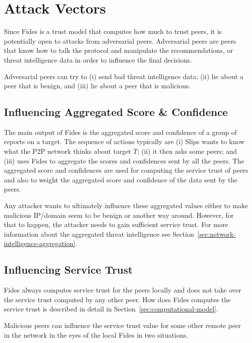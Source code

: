 \section{Attack Vectors}
\label{sec:attack-vectors}
Since Fides is a trust model that computes how much to trust peers, it is potentially open to attacks from adversarial peers. Adversarial peers are peers that know how to talk the protocol and manipulate the recommendations, or threat intelligence data in order to influence the final decisions.

Adversarial peers can try to (i) send bad threat intelligence data; (ii) lie about a peer that is benign, and (iii) lie about a peer that is malicious.

\subsection{Influencing Aggregated Score \& Confidence}
\label{subsec:influencing-aggregated-score-confidence}
The main output of Fides is the aggregated score and confidence of a group of reports on a target. The sequence of actions typically are (i) Slips wants to know what the P2P network thinks about target $T$; (ii) it then asks some peers; and (iii) uses Fides to aggregate the scores and confidences sent by all the peers. The aggregated score and confidences are used for computing the service trust of peers and also to weight the aggregated score and confidence of the data sent by the peers.

Any attacker wants to ultimately influence these aggregated values either to make malicious IP/domain seem to be benign or another way around.
However, for that to happen, the attacker needs to gain sufficient service trust.
For more information about the aggregated threat intelligence see Section~\ref{sec:network-intelligence-aggregation}.

\subsection{Influencing Service Trust}
\label{subsec:influencing-service-trust}
Fides always computes service trust for the peers locally and does not take over the service trust computed by any other peer.
How does Fides computes the service trust is described in detail in Section~\ref{sec:computational-model}.

Malicious peers can influence the service trust value for some other remote peer in the network in the eyes of the local Fides in two situations.

